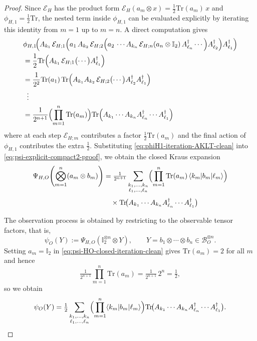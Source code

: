 \documentclass[11pt,a4paper]{article}
\def\Tr{\mathrm{Tr}}
\begin{document}
\begin{proof}
Since $\mathcal{E}_H$ has the product form $\mathcal{E}_H(a_m\otimes x)=\tfrac{1}{2}\Tr(a_m)\,x$ and $\phi_{H,1}=\tfrac{1}{2}\Tr$, the nested term inside $\phi_{H,1}$ can be evaluated explicitly by iterating this identity from $m=1$ up to $m=n$. A direct computation gives
\begin{align}
&\phi_{H,1}\!\Bigl(
A_{k_1}\,
\mathcal{E}_{H;1}\Bigl(
a_1\,
A_{k_2}\,
\mathcal{E}_{H;2}\Bigl(
a_2\,
\cdots
A_{k_n}\,\mathcal{E}_{H;n}(a_n\otimes\mathbb{I}_2)\,
A_{\ell_n}^\dagger
\cdots
\Bigr)
A_{\ell_2}^\dagger
\Bigr)
A_{\ell_1}^\dagger
\Bigr)\nonumber\\
&=
\frac{1}{2}\Tr\Bigl(
A_{k_1}\,
\mathcal{E}_{H;1}\bigl(\cdots\bigr)
A_{\ell_1}^\dagger
\Bigr)
\nonumber\\[0.3em]
&=
\frac{1}{2^2}\Tr(a_1)\,
\Tr\Bigl(
A_{k_1}A_{k_2}\,
\mathcal{E}_{H;2}\bigl(\cdots\bigr)
A_{\ell_2}^\dagger A_{\ell_1}^\dagger
\Bigr)
\nonumber\\
&\;\;\vdots\nonumber\\
&=
\frac{1}{2^{n+1}}
\Bigl(\prod_{m=1}^n \Tr(a_m)\Bigr)
\Tr\Bigl(
A_{k_1}\cdots A_{k_n}
A_{\ell_n}^\dagger\cdots A_{\ell_1}^\dagger
\Bigr)
\label{eq:phiH1-iteration-AKLT-clean}
\end{align}
where at each step $\mathcal{E}_{H;m}$ contributes a factor $\tfrac{1}{2}\Tr(a_m)$ and the final action of $\phi_{H,1}$ contributes the extra $\tfrac{1}{2}$.
Substituting \eqref{eq:phiH1-iteration-AKLT-clean} into \eqref{eq:psi-explicit-compact2-proof}, we obtain the closed Kraus expansion
\begin{align}
\Psi_{H,O}\!\left(\bigotimes_{m=1}^n (a_m\otimes b_m)\right)
&=
\tfrac{1}{2^{n+1}}
\sum_{\substack{k_1,\dots,k_n\\ \ell_1,\dots,\ell_n}}
\Bigl(\prod_{m=1}^{n}\Tr(a_m)\,\langle k_m|b_m|\ell_m\rangle\Bigr)
\nonumber\\[0.3em]
&\quad\times
\Tr\!\bigl(A_{k_1}\cdots A_{k_n} A_{\ell_n}^{\dagger}\cdots A_{\ell_1}^{\dagger}\bigr)
\label{eq:psi-HO-closed-iteration-clean}
\end{align}

The observation process is obtained by restricting to the observable tensor factors, that is,
\[
\psi_{O}(Y)
:=
\Psi_{H,O}(\mathbb{I}_2^{\otimes n}\otimes Y),
\qquad
Y=b_1\otimes\cdots\otimes b_n\in\mathcal{B}_O^{\otimes n}.
\]
Setting $a_m=\mathbb{I}_2$ in \eqref{eq:psi-HO-closed-iteration-clean} gives $\Tr(a_m)=2$ for all $m$ and hence
\[
\tfrac{1}{2^{n+1}}\prod_{m=1}^{n}\Tr(a_m)
=
\tfrac{1}{2^{n+1}}\,2^{n}
=
\tfrac{1}{2},
\]
so we obtain
\begin{equation}\label{eq:psi_O_closed_AKLT_final-clean}
\psi_{O}(Y)
=
\tfrac{1}{2}\sum_{\substack{k_1,\dots,k_n\\ \ell_1,\dots,\ell_n}}
\Bigl(\prod_{m=1}^{n}\langle k_m|b_m|\ell_m\rangle\Bigr)
\Tr\!\bigl(A_{k_1}\cdots A_{k_n} A_{\ell_n}^{\dagger}\cdots A_{\ell_1}^{\dagger}\bigr).
\end{equation}


\end{proof}
\end{document}
